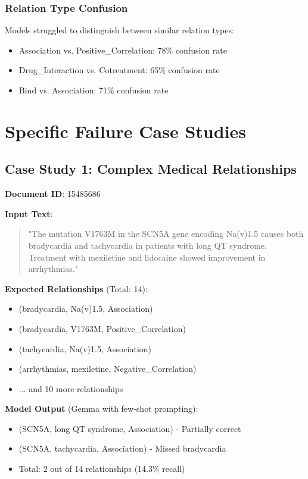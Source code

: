 \subsubsection{Relation Type Confusion}
Models struggled to distinguish between similar relation types:
\begin{itemize}
    \item Association vs. Positive\_Correlation: 78\% confusion rate
    \item Drug\_Interaction vs. Cotreatment: 65\% confusion rate
    \item Bind vs. Association: 71\% confusion rate
\end{itemize}

\section{Specific Failure Case Studies}

\subsection{Case Study 1: Complex Medical Relationships}

\textbf{Document ID}: 15485686

\textbf{Input Text}: 
\begin{quote}
"The mutation V1763M in the SCN5A gene encoding Na(v)1.5 causes both bradycardia and tachycardia in patients with long QT syndrome. Treatment with mexiletine and lidocaine showed improvement in arrhythmias."
\end{quote}

\textbf{Expected Relationships} (Total: 14):
\begin{itemize}
    \item (bradycardia, Na(v)1.5, Association)
    \item (bradycardia, V1763M, Positive\_Correlation)
    \item (tachycardia, Na(v)1.5, Association)
    \item (arrhythmias, mexiletine, Negative\_Correlation)
    \item ... and 10 more relationships
\end{itemize}

\textbf{Model Output} (Gemma with few-shot prompting):
\begin{itemize}
    \item (SCN5A, long QT syndrome, Association) - Partially correct
    \item (SCN5A, tachycardia, Association) - Missed bradycardia
    \item Total: 2 out of 14 relationships (14.3\% recall)
\end{itemize}

